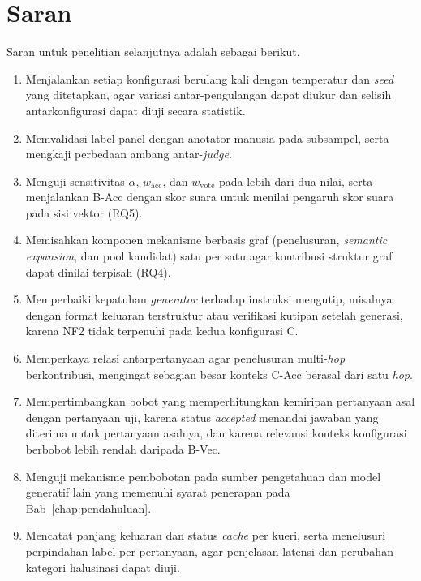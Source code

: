 \section{Saran}
\label{sec:saran}

Saran untuk penelitian selanjutnya adalah sebagai berikut.

\begin{enumerate}
    \item Menjalankan setiap konfigurasi berulang kali dengan temperatur dan \emph{seed} yang ditetapkan, agar variasi antar-pengulangan dapat diukur dan selisih antarkonfigurasi dapat diuji secara statistik.
    \item Memvalidasi label panel dengan anotator manusia pada subsampel, serta mengkaji perbedaan ambang antar-\emph{judge}.
    \item Menguji sensitivitas $\alpha$, $w_{\mathrm{acc}}$, dan $w_{\mathrm{vote}}$ pada lebih dari dua nilai, serta menjalankan B-Acc dengan skor suara untuk menilai pengaruh skor suara pada sisi vektor (RQ5).
    \item Memisahkan komponen mekanisme berbasis graf (penelusuran, \emph{semantic expansion}, dan pool kandidat) satu per satu agar kontribusi struktur graf dapat dinilai terpisah (RQ4).
    \item Memperbaiki kepatuhan \emph{generator} terhadap instruksi mengutip, misalnya dengan format keluaran terstruktur atau verifikasi kutipan setelah generasi, karena NF2 tidak terpenuhi pada kedua konfigurasi C.
    \item Memperkaya relasi antarpertanyaan agar penelusuran multi-\emph{hop} berkontribusi, mengingat sebagian besar konteks C-Acc berasal dari satu \emph{hop}.
    \item Mempertimbangkan bobot yang memperhitungkan kemiripan pertanyaan asal dengan pertanyaan uji, karena status \emph{accepted} menandai jawaban yang diterima untuk pertanyaan asalnya, dan karena relevansi konteks konfigurasi berbobot lebih rendah daripada B-Vec.
    \item Menguji mekanisme pembobotan pada sumber pengetahuan dan model generatif lain yang memenuhi syarat penerapan pada Bab~\ref{chap:pendahuluan}.
    \item Mencatat panjang keluaran dan status \emph{cache} per kueri, serta menelusuri perpindahan label per pertanyaan, agar penjelasan latensi dan perubahan kategori halusinasi dapat diuji.
\end{enumerate}